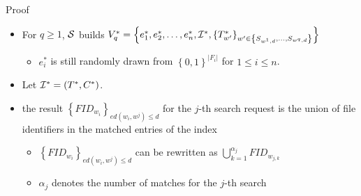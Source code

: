 \documentclass[handout]{beamer}
\begin{document}
\begin{frame}{Proof}
	\begin{itemize}
		\item<1-> 	For $q \ge 1$, $\cal S$ builds $V_q^* = \left\{ {e_1^*,e_2^*, \ldots ,e_n^*,{{\cal I}^*},{{\left\{ {T_{w'}^*} \right\}}_{w' \in \left\{ {{S_{{w^1},d}}, \ldots ,{S_{{w^q},d}}} \right\}}}} \right\}$
				\begin{itemize}
					\item $e_i^*$ is still randomly drawn from ${\left\{ {0,1} \right\}^{\left| {{F_i}} \right|}}$ for $1 \le i \le n$.
				\end{itemize}
		\item<2-> Let ${{\cal I}^*} = ({T^*},{C^*})$.
        \item<3-> the result ${\left\{ {FI{D_{{w_i}}}} \right\}_{ed({w_i},{w^j}) \le d}}$ for the $j$-th search request is the union of file identifiers in the matched entries of the index
		\begin{itemize}
			\item<4-> ${\left\{ {FI{D_{{w_i}}}} \right\}_{ed({w_i},{w^j}) \le d}}$ can be rewritten as $\bigcup\nolimits_{k = 1}^{{\alpha _j}} {FI{D_{{w_{j,k}}}}} $
			\item<5-> ${\alpha _j}$ denotes the number of matches for the $j$-th search
		\end{itemize}
	\end{itemize}
\end{frame}
\end{document}
